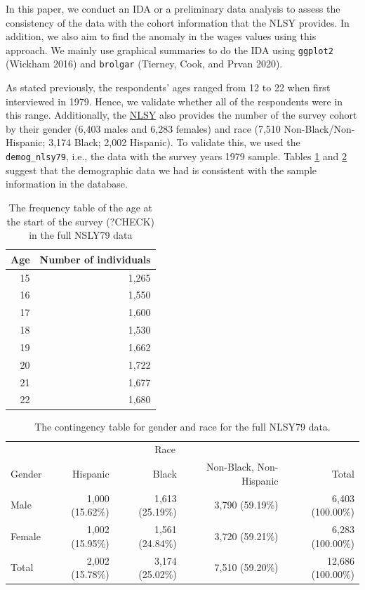 \documentclass{article}
\begin{document}
In this paper, we conduct an IDA or a preliminary data analysis to assess the consistency of the data with the cohort information that the NLSY provides. In addition, we also aim to find the anomaly in the wages values using this approach. We mainly use graphical summaries to do the IDA using \texttt{ggplot2} (Wickham 2016) and \texttt{brolgar} (Tierney, Cook, and Prvan 2020).

As stated previously, the respondents' ages ranged from 12 to 22 when first interviewed in 1979. Hence, we validate whether all of the respondents were in this range. Additionally, the \href{https://www.nlsinfo.org/content/cohorts/nlsy79/intro-to-the-sample/nlsy79-sample-introduction}{NLSY} also provides the number of the survey cohort by their gender (6,403 males and 6,283 females) and race (7,510 Non-Black/Non-Hispanic; 3,174 Black; 2,002 Hispanic). To validate this, we used the \texttt{demog\_nlsy79}, i.e., the data with the survey years 1979 sample.
Tables \ref{tab:age-table} and \ref{tab:gender-race-table} suggest that the demographic data we had is consistent with the sample information in the database.

\begin{table}

\caption{\label{tab:age-table}The frequency table of the age at the start of the survey (?CHECK) in the full NSLY79 data}
\centering
\begin{tabular}[t]{rr}
\toprule
Age & Number of individuals\\
\midrule
15 & 1,265\\
16 & 1,550\\
17 & 1,600\\
18 & 1,530\\
19 & 1,662\\
20 & 1,722\\
21 & 1,677\\
22 & 1,680\\
\bottomrule
\end{tabular}
\end{table}

\begin{table}

\caption{\label{tab:gender-race-table}The contingency table for gender and race for the full NLSY79 data.}
\centering
\begin{tabular}[t]{lrrrr}
\toprule
\multicolumn{1}{c}{ } & \multicolumn{3}{c}{Race} & \multicolumn{1}{c}{ } \\
\cmidrule(l{3pt}r{3pt}){2-4}
Gender & Hispanic & Black & Non-Black, Non-Hispanic & Total\\
\midrule
Male & 1,000 (15.62\%) & 1,613 (25.19\%) & 3,790 (59.19\%) & 6,403 (100.00\%)\\
Female & 1,002 (15.95\%) & 1,561 (24.84\%) & 3,720 (59.21\%) & 6,283 (100.00\%)\\
\midrule
Total & 2,002 (15.78\%) & 3,174 (25.02\%) & 7,510 (59.20\%) & 12,686 (100.00\%)\\
\bottomrule
\end{tabular}
\end{table}
\end{document}
